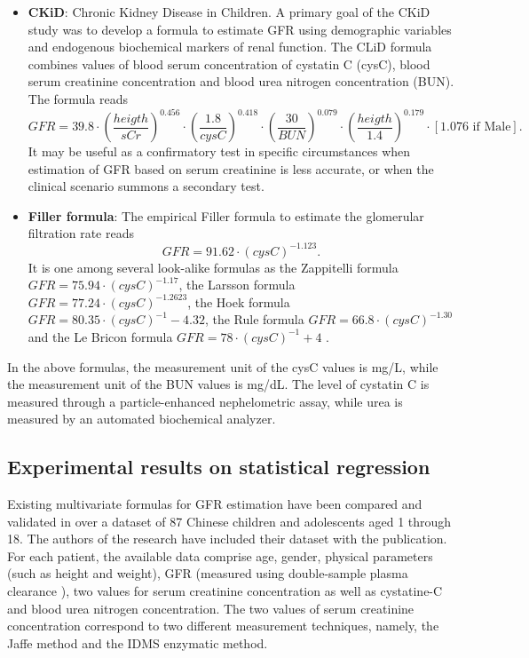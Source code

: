 \documentclass[10pt,final]{siamltex}
\begin{document}
\begin{itemize}
\item \textbf{CKiD}: Chronic Kidney Disease in Children. A primary goal of the CKiD study was to develop a formula to estimate GFR using demographic variables and endogenous biochemical markers of renal function. The CLiD formula combines values of blood serum concentration of cystatin C (cysC), blood serum creatinine concentration and blood urea nitrogen concentration (BUN). The formula reads
%
\begin{equation}
 \mathit{GFR} = 39.8 \cdot \left(\frac{heigth}{sCr}\right)^{0.456} \cdot \left(\frac{1.8}{cysC}\right)^{0.418} \cdot \left(\frac{30}{\textit{BUN}}\right)^{0.079} \cdot \left(\frac{heigth}{1.4}\right)^{0.179}\cdot [1.076 \text{ if Male}].
\end{equation}
%
It may be useful as a confirmatory test in specific circumstances when estimation of GFR based on serum creatinine is less accurate, or when the clinical scenario summons a secondary test\cite{grubb,schwartz3}.

\item \textbf{Filler formula}: The empirical Filler formula to estimate the glomerular filtration rate reads
%
\begin{equation}
 \textit{GFR} = 91.62 \cdot (cysC)^{-1.123}.
\end{equation}
%
It is one among several look-alike formulas as the Zappitelli formula $\textit{GFR} = 75.94 \cdot (cysC)^{-1.17}$, the Larsson formula $\textit{GFR} = 77.24 \cdot (cysC)^{-1.2623}$, the Hoek formula $\textit{GFR} = 80.35 \cdot (cysC)^{-1} - 4.32$, the Rule formula $\textit{GFR} = 66.8 \cdot (cysC)^{-1.30}$ and the Le Bricon formula $\textit{GFR} = 78 \cdot (cysC)^{-1} + 4$ \cite{laskin}.
\end{itemize}
%

In the above formulas, the measurement unit of the cysC values is mg/L, while the measurement unit of the BUN values is mg/dL. The level of cystatin C is measured through a particle-enhanced nephelometric assay, while urea is measured by an automated biochemical analyzer.
%
\subsection{Experimental results on statistical regression}
%
Existing multivariate formulas for GFR estimation have been compared and validated in \cite{gfr} over a dataset of 87 Chinese children and adolescents aged 1 through 18. The authors of the research have included their dataset with the publication. For each patient, the available data comprise age, gender, physical parameters (such as height and weight), GFR (measured using double-sample plasma clearance \cite{gold}), two values for serum creatinine concentration as well as cystatine-C and blood urea nitrogen concentration. The two values of serum creatinine concentration correspond to two different measurement techniques, namely, the Jaffe method and the IDMS enzymatic method.
\end{document}
